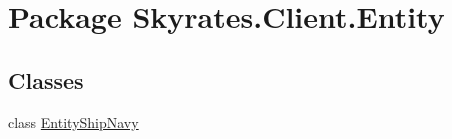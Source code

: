 \hypertarget{namespace_skyrates_1_1_client_1_1_entity}{\section{Package Skyrates.\-Client.\-Entity}
\label{namespace_skyrates_1_1_client_1_1_entity}
}
\subsection*{Classes}
\begin{DoxyCompactItemize}
\item 
class \hyperlink{class_skyrates_1_1_client_1_1_entity_1_1_entity_ship_navy}{Entity\-Ship\-Navy}
\end{DoxyCompactItemize}
